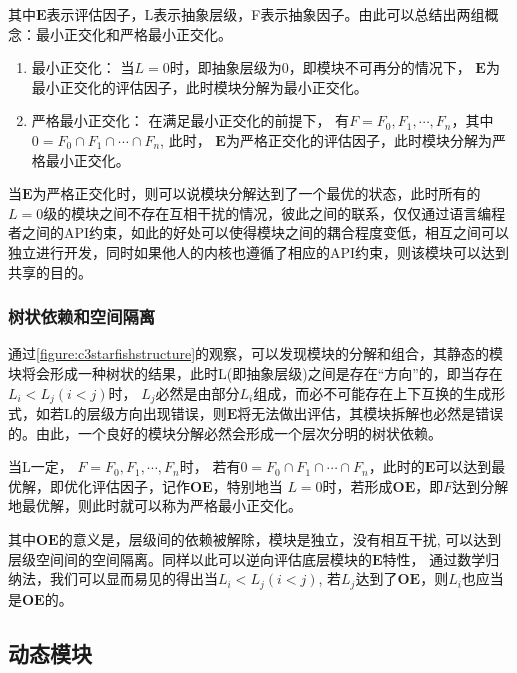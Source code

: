 其中$\boldsymbol{E}$表示评估因子，L表示抽象层级，F表示抽象因子。由此可以总结出两组概念：最小正交化和严格最小正交化。

\begin{enumerate}
    \item 最小正交化： 当$L=0$时，即抽象层级为0，即模块不可再分的情况下， $\boldsymbol{E}$为最小正交化的评估因子，此时模块分解为最小正交化。
    \item 严格最小正交化： 在满足最小正交化的前提下， 有$F = {F_{0}, F_{1}, \cdots, F_{n}}$，其中$0 = {F_{0} \cap F_{1} \cap \cdots \cap F_{n}}$, 此时， $\boldsymbol{E}$为严格正交化的评估因子，此时模块分解为严格最小正交化。
\end{enumerate}

当$\boldsymbol{E}$为严格正交化时，则可以说模块分解达到了一个最优的状态，此时所有的$L=0$级的模块之间不存在互相干扰的情况，彼此之间的联系，仅仅通过语言编程者之间的API约束，如此的好处可以使得模块之间的耦合程度变低，相互之间可以独立进行开发，同时如果他人的内核也遵循了相应的API约束，则该模块可以达到共享的目的。


\subsubsection{树状依赖和空间隔离}


通过\autoref{figure:c3starfishstructure}的观察，可以发现模块的分解和组合，其静态的模块将会形成一种树状的结果，此时L(即抽象层级)之间是存在“方向”的，即当存在$L_{i} < L_{j} (i < j)$时， $L_{j}$必然是由部分$L_{i}$组成，而必不可能存在上下互换的生成形式，如若L的层级方向出现错误，则$\boldsymbol{E}$将无法做出评估，其模块拆解也必然是错误的。由此，一个良好的模块分解必然会形成一个层次分明的树状依赖。

当L一定， $F = {F_{0}, F_{1}, \cdots, F_{n}}$时， 若有$0 = {F_{0} \cap F_{1} \cap \cdots \cap F_{n}}$，此时的$\boldsymbol{E}$可以达到最优解，即优化评估因子，记作$\boldsymbol{OE}$，特别地当 $L = 0$时，若形成$\boldsymbol{OE}$，即$F$达到分解地最优解，则此时就可以称为严格最小正交化。

其中$\boldsymbol{OE}$的意义是，层级间的依赖被解除，模块是独立，没有相互干扰, 可以达到层级空间间的空间隔离。同样以此可以逆向评估底层模块的$\boldsymbol{E}$特性， 通过数学归纳法，我们可以显而易见的得出当$L_{i} < L_{j} (i < j)$, 若$L_{j}$达到了$\boldsymbol{OE}$，则$L_{i}$也应当是$\boldsymbol{OE}$的。

\subsection{动态模块}

